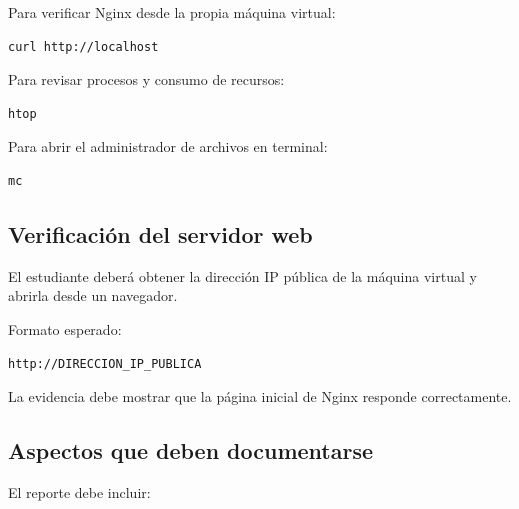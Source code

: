 \documentclass[
  coursetitle={Cómputo Nube y Tecnologías Emergentes},
  coursehours={96},
  coursedate={Verano 2026},
  doctype={Tarea 2},
  otherlangs={english,french},
  authorname={Lázaro},
  authorsurname={Bustio-Martínez},
  authortitle={PhD},
  role={Profesor Investigador},
  email={lbustio@inaoe.mx},
  phone={5559504000},
  ext={7459},
  institution={Instituto Nacional de Astrofísica, Óptica y Electrónica (INAOE)},
  department={Maestría en Ciencias en Tecnologías de Seguridad},
  address={Luis Enrique Erro 1, Sta. Ma. Tonantzintla, San Andrés Cholula, CP 72840, Puebla, México},
  margin={0.5in}
]{lbustio_lecture_notes}
\begin{document}
Para verificar Nginx desde la propia máquina virtual:

\begin{verbatim}
curl http://localhost
\end{verbatim}

Para revisar procesos y consumo de recursos:

\begin{verbatim}
htop
\end{verbatim}

Para abrir el administrador de archivos en terminal:

\begin{verbatim}
mc
\end{verbatim}

\subsection{Verificación del servidor web}
\label{sec:tarea2-verificacion-web}

El estudiante deberá obtener la dirección IP pública de la máquina virtual y abrirla desde un navegador.

Formato esperado:

\begin{verbatim}
http://DIRECCION_IP_PUBLICA
\end{verbatim}

La evidencia debe mostrar que la página inicial de Nginx responde correctamente.

\subsection{Aspectos que deben documentarse}
\label{sec:tarea2-aspectos}

El reporte debe incluir:
\end{document}
